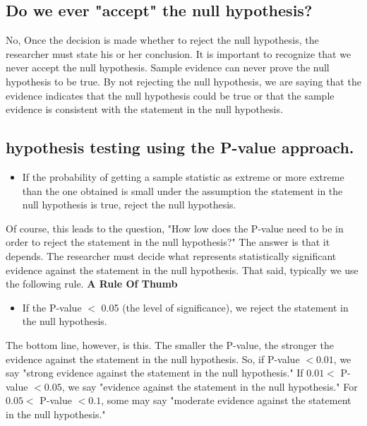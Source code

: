 \documentclass{report}
\begin{document}
    \pagebreak 
    \subsection*{Do we ever "accept" the null hypothesis?}
    \bigbreak \noindent 
    No, Once the decision is made whether to reject the null hypothesis, the researcher must state his or her conclusion. It is important to recognize that we never accept the null hypothesis. 
    \bigbreak \noindent 
    Sample evidence can never prove the null hypothesis to be true. By not rejecting the null hypothesis, we are saying that the evidence indicates that the null hypothesis could be true or that the sample evidence is consistent with the statement in the null hypothesis.

    \bigbreak \noindent \bigbreak \noindent 
    \subsection*{hypothesis testing using the P-value approach.}
    \bigbreak \noindent 
        \begin{itemize}
        \item If the probability of getting a sample statistic as extreme or more extreme than the one obtained is small under the assumption the statement in the null hypothesis is true, reject the null hypothesis.
    \end{itemize}
    \bigbreak \noindent 
    Of course, this leads to the question, "How low does the P-value need to be in order to reject the statement in the null hypothesis?" The answer is that it depends. The researcher must decide what represents statistically significant evidence against the statement in the null hypothesis. That said, typically we use the following rule.
    \bigbreak \noindent 
    \textbf{A Rule Of Thumb}
    \begin{itemize}
        \item If the P-value $<$ 0.05 (the level of significance), we reject the statement in the null hypothesis.
    \end{itemize}
    \bigbreak \noindent 
    The bottom line, however, is this. The smaller the P-value, the stronger the evidence against the statement in the null hypothesis. So, if P-value $<0.01$, we say "strong evidence against the statement in the null hypothesis." If $0.01<$ P-value $<0.05$, we say "evidence against the statement in the null hypothesis." For $0.05<$ P-value $<0.1$, some may say "moderate evidence against the statement in the null hypothesis."
\end{document}
